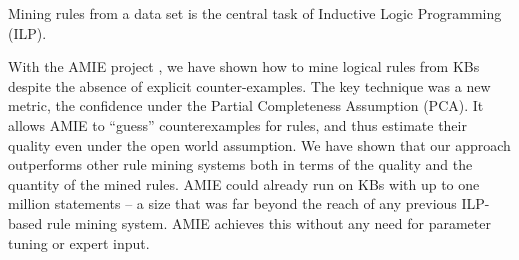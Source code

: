 Mining rules from a data set is the central task of Inductive Logic Programming (ILP).


With the AMIE project \cite{amie}, we have shown how to mine logical rules from KBs despite the absence of explicit counter-examples.
The key technique was a new metric, the confidence under the Partial Completeness Assumption (PCA). It 
allows AMIE to ``guess'' counterexamples for rules, and thus estimate their quality even under the open world assumption.
We have shown that our approach outperforms other rule mining systems %
both in terms of the quality and the quantity of the mined rules.
AMIE could already run on KBs with up to one million statements -- a size that was far beyond the reach of any previous ILP-based rule mining system.
AMIE achieves this without any need for parameter tuning or expert input.

